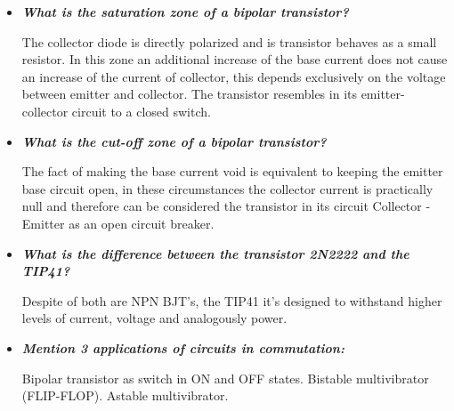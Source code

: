 \begin{itemize}
\item {\bfseries\itshape What is the saturation zone of a bipolar transistor?} \hfill \break

The collector diode is directly polarized and is transistor behaves as a small resistor.
In this zone an additional increase of the base current does not cause an increase of the current of
collector, this depends exclusively on the voltage between emitter and collector. The transistor resembles in its
emitter-collector circuit to a closed switch.  \hfill \break

\item {\bfseries\itshape What is the cut-off zone of a bipolar transistor?} \hfill \break 

The fact of making the base current void is equivalent to keeping the emitter base circuit open,
in these circumstances the collector current is practically null and therefore can be considered the
transistor in its circuit Collector - Emitter as an open circuit breaker.  \hfill \break

\item {\bfseries\itshape What is the difference between the transistor 2N2222 and the TIP41?} \hfill \break

Despite of both are NPN BJT's, the TIP41 it's designed to withstand higher levels of current, voltage and analogously power.  \hfill \break

\item {\bfseries\itshape Mention 3 applications of circuits in commutation:} \hfill \break  

\begin{tasks}
\task Bipolar transistor as switch in ON and OFF states.
\task Bistable multivibrator (FLIP-FLOP).
\task Astable multivibrator.
\end{tasks}

\end{itemize}

\pagebreak